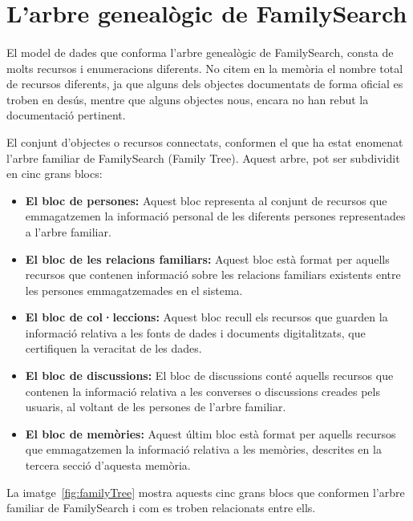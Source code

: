 \section{L'arbre genealògic de FamilySearch}

    \paragraph{}
    El model de dades que conforma l'arbre genealògic de FamilySearch, consta de molts recursos i enumeracions diferents. No citem en la memòria el nombre total de recursos diferents, ja que alguns dels objectes documentats de forma oficial es troben en desús, mentre que alguns objectes nous, encara no han rebut la documentació pertinent.

    El conjunt d'objectes o recursos connectats, conformen el que ha estat enomenat l'arbre familiar de FamilySearch (Family Tree). Aquest arbre, pot ser subdividit en cinc grans blocs:

    \begin{itemize}
        \item \textbf{El bloc de persones:} Aquest bloc representa al conjunt de recursos que emmagatzemen la informació personal de les diferents persones representades a l'arbre familiar.
        \item \textbf{El bloc de les relacions familiars:} Aquest bloc està format per aquells recursos que contenen informació sobre les relacions familiars existents entre les persones emmagatzemades en el sistema.
        \item \textbf{El bloc de col·leccions:} Aquest bloc recull els recursos que guarden la informació relativa a les fonts de dades i documents digitalitzats, que certifiquen la veracitat de les dades.
        \item \textbf{El bloc de discussions:} El bloc de discussions conté aquells recursos que contenen la informació relativa a les converses o discussions creades pels usuaris, al voltant de les persones de l'arbre familiar.
        \item \textbf{El bloc de memòries:} Aquest últim bloc està format per aquells recursos que emmagatzemen la informació relativa a les memòries, descrites en la tercera secció d'aquesta memòria.
    \end{itemize}

    La imatge~\ref{fig:familyTree} mostra aquests cinc grans blocs que conformen l'arbre familiar de FamilySearch i com es troben relacionats entre ells.

